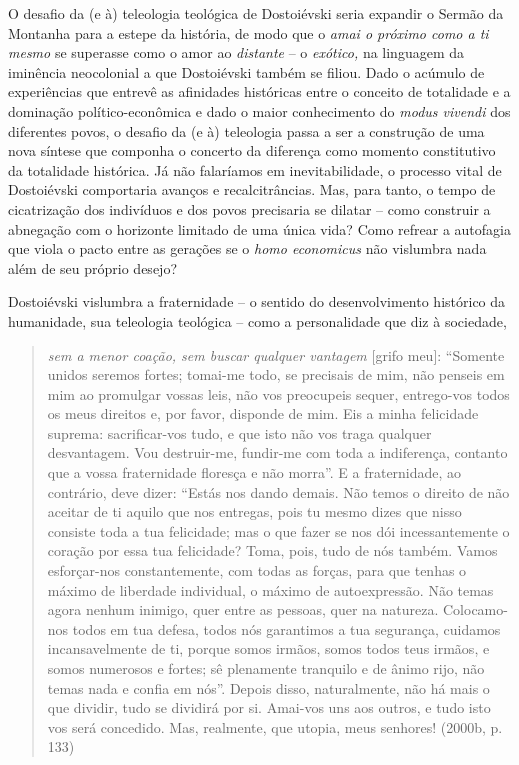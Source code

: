 O desafio da (e à) teleologia teológica de Dostoiévski seria expandir o
Sermão da Montanha para a estepe da história, de modo que o \emph{amai o
próximo como a ti mesmo} se superasse como o amor ao \emph{distante} --
o \emph{exótico,} na linguagem da iminência neocolonial a que
Dostoiévski também se filiou. Dado o acúmulo de experiências que entrevê
as afinidades históricas entre o conceito de totalidade e a dominação
político-econômica e dado o maior conhecimento do \emph{modus vivendi}
dos diferentes povos, o desafio da (e à) teleologia passa a ser a
construção de uma nova síntese que componha o concerto da diferença como
momento constitutivo da totalidade histórica. Já não falaríamos em
inevitabilidade, o processo vital de Dostoiévski comportaria avanços e
recalcitrâncias. Mas, para tanto, o tempo de cicatrização dos indivíduos
e dos povos precisaria se dilatar -- como construir a abnegação com o
horizonte limitado de uma única vida? Como refrear a autofagia que viola
o pacto entre as gerações se o \emph{homo economicus} não vislumbra nada
além de seu próprio desejo?

Dostoiévski vislumbra a fraternidade -- o sentido do desenvolvimento
histórico da humanidade, sua teleologia teológica -- como a
personalidade que diz à sociedade,

\begin{quote}
\emph{sem a menor coação, sem buscar qualquer vantagem} {[}grifo meu{]}:
``Somente unidos seremos fortes; tomai-me todo, se precisais de mim, não
penseis em mim ao promulgar vossas leis, não vos preocupeis sequer,
entrego-vos todos os meus direitos e, por favor, disponde de mim. Eis a
minha felicidade suprema: sacrificar-vos tudo, e que isto não vos traga
qualquer desvantagem. Vou destruir-me, fundir-me com toda a indiferença,
contanto que a vossa fraternidade floresça e não morra''. E a
fraternidade, ao contrário, deve dizer: ``Estás nos dando demais. Não
temos o direito de não aceitar de ti aquilo que nos entregas, pois tu
mesmo dizes que nisso consiste toda a tua felicidade; mas o que fazer se
nos dói incessantemente o coração por essa tua felicidade? Toma, pois,
tudo de nós também. Vamos esforçar-nos constantemente, com todas as
forças, para que tenhas o máximo de liberdade individual, o máximo de
autoexpressão. Não temas agora nenhum inimigo, quer entre as pessoas,
quer na natureza. Colocamo-nos todos em tua defesa, todos nós garantimos
a tua segurança, cuidamos incansavelmente de ti, porque somos irmãos,
somos todos teus irmãos, e somos numerosos e fortes; sê plenamente
tranquilo e de ânimo rijo, não temas nada e confia em nós''. Depois
disso, naturalmente, não há mais o que dividir, tudo se dividirá por si.
Amai-vos uns aos outros, e tudo isto vos será concedido. Mas, realmente,
que utopia, meus senhores! (2000b, p. 133)
\end{quote}

